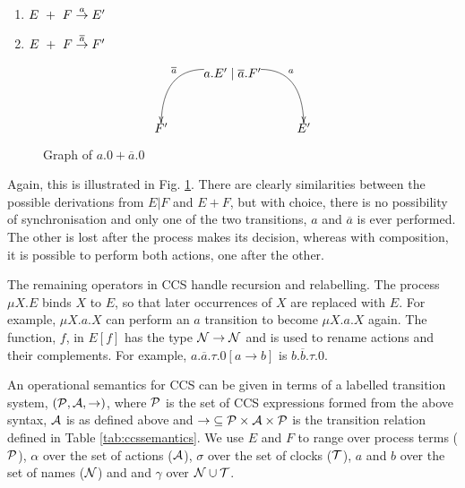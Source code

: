 \begin{enumerate}
\item $E\ +\ F \stackrel{a}{\rightarrow} E'$
\item $E\ +\ F \stackrel{\overline{a}}{\rightarrow} F'$
\end{enumerate}


\begin{figure}  
  \centering
\[
\xy
(20,0)*{a.E' \mid \overline{a}.F'}="1";
(0,-15)*{F'}="2";
(40,-15)*{E'}="3";
{\ar@/^2pc/^{a} "1";"3"};
{\ar@/_2pc/_{\overline{a}} "1";"2"};
\endxy
\]
  \caption{Graph of $a.0 + \overline{a}.0$}
  \label{fig:graph2}
\end{figure}

Again, this is illustrated in Fig. \ref{fig:graph2}.  There are
clearly similarities between the possible derivations from $E|F$ and
$E+F$, but with choice, there is no possibility of synchronisation and
only one of the two transitions, $a$ and $\overline{a}$ is ever
performed.  The other is lost after the process makes its decision,
whereas with composition, it is possible to perform both actions, one
after the other.

The remaining operators in CCS handle recursion and relabelling.  The
process $\mu X.E$ binds $X$ to $E$, so that later occurrences of $X$
are replaced with $E$.  For example, $\mu X.a.X$ can perform an $a$
transition to become $\mu X.a.X$ again.  The function, $f$, in $E[f]$
has the type $\text{$\mathcal{N}$} \rightarrow \text{$\mathcal{N}$}$ and is used to rename actions
and their complements.  For example, $a.\overline{a}.\tau.0[a
  \rightarrow b]$ is $b.\overline{b}.\tau.0$.

An operational semantics for CCS can be given in terms of a labelled
transition system, $(\text{$\mathcal{P}$}, \text{$\mathcal{A}$}, \rightarrow)$, where $\text{$\mathcal{P}$}$
is the set of CCS expressions formed from the above syntax, $\text{$\mathcal{A}$}$
is as defined above and $\mathop{\rightarrow} \mathrel{\subseteq}
\text{$\mathcal{P}$} \times \text{$\mathcal{A}$} \times \text{$\mathcal{P}$}$ is the transition relation
defined in Table \ref{tab:ccssemantics}.  We use $E$ and $F$ to range
over process terms ($\text{$\mathcal{P}$}$), $\alpha$ over the set of actions
($\text{$\mathcal{A}$}$), $\sigma$ over the set of clocks ($\text{$\mathcal{T}$}$), $a$ and $b$
over the set of names ($\text{$\mathcal{N}$}$) and and $\gamma$ over $\text{$\mathcal{N}$} \cup
\text{$\mathcal{T}$}$.

